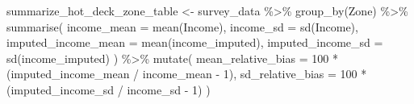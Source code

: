 \documentclass[
  spanish,
  11pt,
  letterpaper,
  oneside,
  open=any]{scrbook}
\newenvironment{Shaded}{\begin{snugshade}}{\end{snugshade}}
\newcommand{\AttributeTok}[1]{\textcolor[rgb]{0.40,0.45,0.13}{#1}}
\newcommand{\DecValTok}[1]{\textcolor[rgb]{0.68,0.00,0.00}{#1}}
\newcommand{\FunctionTok}[1]{\textcolor[rgb]{0.28,0.35,0.67}{#1}}
\newcommand{\NormalTok}[1]{\textcolor[rgb]{0.00,0.23,0.31}{#1}}
\newcommand{\OtherTok}[1]{\textcolor[rgb]{0.00,0.23,0.31}{#1}}
\newcommand{\SpecialCharTok}[1]{\textcolor[rgb]{0.37,0.37,0.37}{#1}}
\begin{document}
\begin{Shaded}
\begin{Highlighting}[]
\NormalTok{summarize\_hot\_deck\_zone\_table }\OtherTok{\textless{}{-}}\NormalTok{ survey\_data }\SpecialCharTok{\%\textgreater{}\%}
  \FunctionTok{group\_by}\NormalTok{(Zone) }\SpecialCharTok{\%\textgreater{}\%}
  \FunctionTok{summarise}\NormalTok{(}
    \AttributeTok{income\_mean =} \FunctionTok{mean}\NormalTok{(Income),}
    \AttributeTok{income\_sd =} \FunctionTok{sd}\NormalTok{(Income),}
    \AttributeTok{imputed\_income\_mean =} \FunctionTok{mean}\NormalTok{(income\_imputed),}
    \AttributeTok{imputed\_income\_sd =} \FunctionTok{sd}\NormalTok{(income\_imputed)}
\NormalTok{  ) }\SpecialCharTok{\%\textgreater{}\%}
  \FunctionTok{mutate}\NormalTok{(}
    \AttributeTok{mean\_relative\_bias =} \DecValTok{100} \SpecialCharTok{*}\NormalTok{ (imputed\_income\_mean }\SpecialCharTok{/}\NormalTok{ income\_mean }\SpecialCharTok{{-}} \DecValTok{1}\NormalTok{),}
    \AttributeTok{sd\_relative\_bias =} \DecValTok{100} \SpecialCharTok{*}\NormalTok{ (imputed\_income\_sd }\SpecialCharTok{/}\NormalTok{ income\_sd }\SpecialCharTok{{-}} \DecValTok{1}\NormalTok{)}
\NormalTok{  )}
\end{Highlighting}
\end{Shaded}
\end{document}
